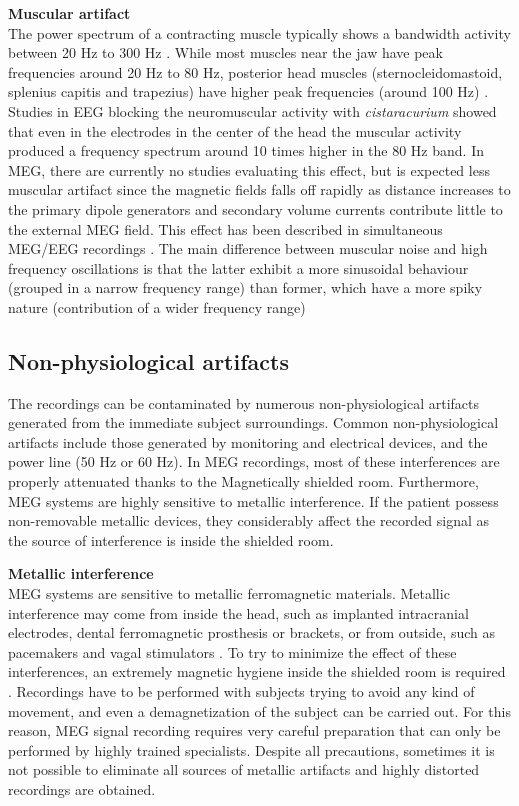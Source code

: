 \textbf{Muscular artifact}
\\
The power spectrum of a contracting muscle typically shows a bandwidth activity between 20 Hz to 300 Hz \citep{Criswell2011}. While most muscles near the jaw have peak frequencies around 20 Hz to 80 Hz, posterior head muscles (sternocleidomastoid, splenius capitis and trapezius) have higher peak frequencies (around 100 Hz) \citep{Muthukumaraswamy2013}. Studies in EEG blocking the neuromuscular activity with \textit{cistaracurium} \citep{whitham2007,whitham2008} showed that even in the electrodes in the center of the head the muscular activity produced a frequency spectrum around 10 times higher in the 80 Hz band. In MEG, there are currently no studies evaluating this effect, but is expected less muscular artifact since the magnetic fields falls off rapidly as distance increases to the primary dipole generators and secondary volume currents contribute little to the external MEG field\citep{Hamalainen1993}. This effect has been described in simultaneous MEG/EEG recordings \citep{Claus2012}. The main difference between muscular noise and high frequency oscillations is that the latter exhibit a more sinusoidal behaviour (grouped in a narrow frequency range) than former, which have a more spiky nature (contribution of a wider frequency range)
  

\subsection{Non-physiological artifacts}

The recordings can be contaminated by numerous non-physiological artifacts generated from the immediate subject surroundings. Common non-physiological artifacts include those generated by monitoring and electrical devices, and the power line (50 Hz or 60 Hz). In MEG recordings, most of these interferences are properly attenuated thanks to the Magnetically shielded room. Furthermore, MEG systems are highly sensitive to metallic interference. If the patient possess non-removable metallic devices, they considerably affect the recorded signal as the source of interference is inside the shielded room. 
 
\textbf{Metallic interference}
\\
MEG systems are sensitive to metallic ferromagnetic materials. Metallic interference may come from inside the head, such as implanted intracranial electrodes, dental ferromagnetic prosthesis or brackets, or from outside, such as pacemakers and vagal stimulators \citep{Vrba2002}. To try to minimize the effect of these interferences, an extremely magnetic hygiene inside the shielded room is required \citep{Hillebrand2013}. Recordings have to be performed with subjects trying to avoid any kind of movement, and even a demagnetization of the subject can be carried out. For this reason, MEG signal recording requires very careful preparation that can only be performed by highly trained specialists. Despite all precautions, sometimes it is not possible to eliminate all sources of metallic artifacts and highly distorted recordings are obtained. 

